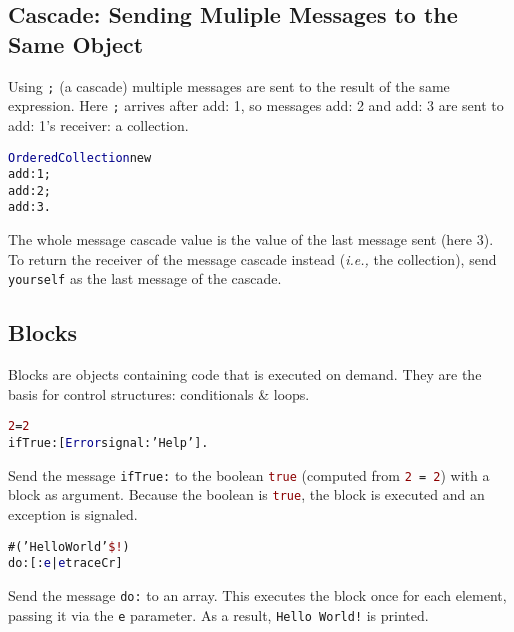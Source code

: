 \documentclass[notumble]{leaflet}
\makeatletter
\newcommand{\ie}{\emph{i.e.,}\xspace}
\newcommand{\ct}[1]{{\textsf{#1}}\xspace}
\newenvironment{displaycode}{%
     \par
     \hspace{1.5em}\begin{minipage}{\linewidth}
       \begin{alltt}\small}{
       \end{alltt}
     \end{minipage}
     \par}
\newcommand{\code}[1]{\foreignlanguage{english}{\texttt{#1}}}
\makeatother
\begin{document}
\vspace{-0.3cm}
\subsection{Cascade: Sending Muliple Messages to the Same Object}

Using \code{;} (a cascade) multiple messages are sent to the result of the  same expression.
Here \code{;} arrives after \ct{add: 1}, so messages \ct{add: 2} and \ct{add: 3} are sent to \ct{add: 1}'s receiver: a collection.
\begin{displaycode}
\textcolor{darkBlue}{OrderedCollection} new
  add: \textcolor{string}{1};
  add: \textcolor{string}{2};
  add: \textcolor{string}{3}.
\end{displaycode}

The whole message cascade value is the value of the last message sent (here 3). To return the receiver of the message cascade instead (\ie the collection), send
\code{yourself} as the last message of the cascade.

\vspace{-0.3cm}
\subsection{Blocks}
Blocks are objects containing code that is executed on demand. They are the basis for control structures:
conditionals \& loops.

\begin{displaycode}
\textcolor{darkRed}{2} = \textcolor{darkRed}{2}
  ifTrue: [ \textcolor{darkBlue}{Error} signal: \textcolor{string}{'Help'} ].
\end{displaycode}
Send the message \code{ifTrue:} to the boolean
\textcolor{darkRed}{\code{true}} (computed from
\code{\textcolor{darkRed}{2} = \textcolor{darkRed}{2}}) with a block
as argument. Because the boolean is \textcolor{darkRed}{\code{true}},
the block is executed and an exception is signaled.

\begin{displaycode}
\#(\textcolor{string}{'Hello World'} \textcolor{darkRed}{\$!})
  do: [ :\textcolor{darkBlue}{e} | \textcolor{darkBlue}{e} traceCr ]
\end{displaycode}

Send the message \code{do:} to an array. This executes the block
once for each element, passing it via the \code{e} parameter. As a
result, \code{\textcolor{string}{Hello~World!}} is printed.
\end{document}
